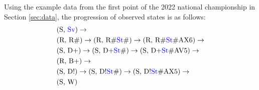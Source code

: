 \documentclass[USenglish]{article}
\theoremstyle{dgthm}
\theoremstyle{dgdef}
\begin{document}
Using the example data from the first point of the 2022 national championship in Section \ref{sec:data}, the progression of observed states is as follows:
\begin{align*}
    &\mbox{(S, \textcolor{blue}{Sv})}  \rightarrow\\
    &\mbox{(R, R\#)} \rightarrow \mbox{(R, R\#\textcolor{blue}{St}\#)} \rightarrow \mbox{(R, R\#\textcolor{blue}{St}\#AX6)} \rightarrow\\
    &\mbox{(S, D+)}  \rightarrow \mbox{(S, D+\textcolor{blue}{St}\#)}  \rightarrow \mbox{(S, D+\textcolor{blue}{St}\#AV5)}  \rightarrow\\
    &\mbox{(R, B+)}  \rightarrow\\
    &\mbox{(S, D!)}  \rightarrow \mbox{(S, D!\textcolor{blue}{St}\#)}  \rightarrow \mbox{(S, D!\textcolor{blue}{St}\#AX5)}  \rightarrow\\
    &\mbox{(S, W)}
\end{align*}
\end{document}
